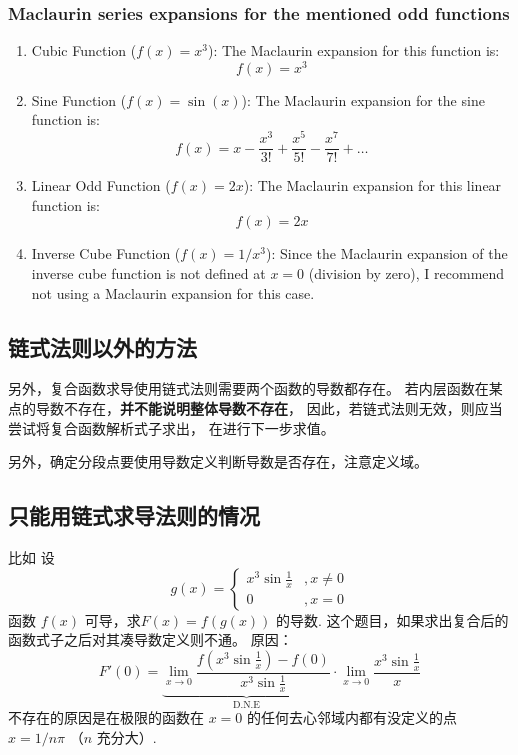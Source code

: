 \subsubsection{Maclaurin series expansions for the mentioned odd functions}

\begin{enumerate}
    \item Cubic Function ($f(x) = x^3$):
       The Maclaurin expansion for this function is:
       $$f(x) = x^3$$

    \item Sine Function ($f(x) = \sin(x)$):
       The Maclaurin expansion for the sine function is:
       $$f(x) = x - \frac{x^3}{3!} + \frac{x^5}{5!} - \frac{x^7}{7!} + \ldots$$

    \item Linear Odd Function ($f(x) = 2x$):
       The Maclaurin expansion for this linear function is:
       $$f(x) = 2x$$

    \item Inverse Cube Function ($f(x) = 1/x^3$):
       Since the Maclaurin expansion of the inverse cube function is not defined at $x = 0$ (division by zero), I recommend not using a Maclaurin expansion for this case.
\end{enumerate}


\subsection{链式法则以外的方法}

另外，复合函数求导使用链式法则需要两个函数的导数都存在。
若内层函数在某点的导数不存在，\textbf{并不能说明整体导数不存在}，
因此，若链式法则无效，则应当尝试将复合函数解析式子求出，
在进行下一步求值。

另外，确定分段点要使用导数定义判断导数是否存在，注意定义域。

\subsection{只能用链式求导法则的情况}

比如 设
\[
    g(x) = 
    \left\{
        \begin{array}{rl}
            x^3 \sin \frac{1}{x} &, x \neq 0 \\
            0  &, x = 0
        \end{array}
    \right.
\]
函数 $f(x)$ 可导，求$F(x)=f(g(x))$ 的导数.
这个题目，如果求出复合后的函数式子之后对其凑导数定义则不通。
原因：
\[
    F'(0) = \underbrace{\lim_{x \to 0} \dfrac{f(x^3 \sin \frac{1}{x}) - f(0)}{x^3 \sin \frac{1}{x}}}_{\mbox{D.N.E}}
    \cdot \lim_{x \to 0} \dfrac{x^3 \sin \frac{1}{x}}{x}
\]
不存在的原因是在极限的函数在 $x=0$ 的任何去心邻域内都有没定义的点 $x = 1/n\pi$ （$n$ 充分大）.

